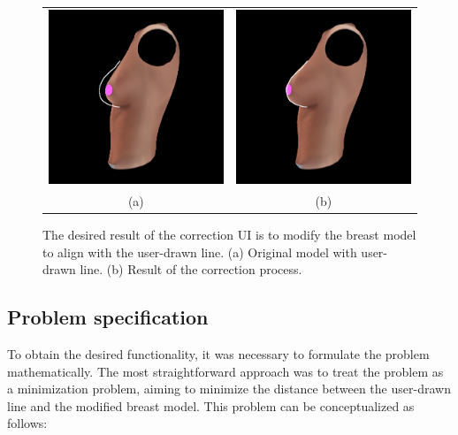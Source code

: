 \begin{figure}[H]
    \centering
    \begin{tabular}{@{}cc@{}}
        \includegraphics[width=0.487\linewidth]{figures/correction_ui_pre.png}&
        \includegraphics[width=0.487\linewidth]{figures/correction_ui_post.png}\\
        (a)&(b)\\
        \end{tabular}
    \caption[Correction UI results]{The desired result of the correction UI is to modify the breast model to align with the user-drawn line.
    \textup{(a)} Original model with user-drawn line.
    \textup{(b)} Result of the correction process.
    }
    \label{fig:ui_correction}
\end{figure}

\subsection{Problem specification}

To obtain the desired functionality, it was necessary to formulate the problem mathematically. The most straightforward approach was to treat the problem as a minimization problem, 
aiming to minimize the distance between the user-drawn line and the modified breast model. This problem can be conceptualized as follows:

